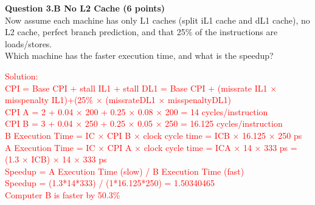 \documentclass[a4paper,10pt]{article}
\begin{document}
\begin{enumerate}
\textbf{Question 3.B  No L2 Cache (6 points)}\\
Now assume each machine has only L1 caches (split iL1 cache and dL1 cache), no L2 cache, perfect branch prediction, and that 25\% of the instructions are loads/stores. \\
Which machine has the faster execution time, and what is the speedup?\\

\noindent\fbox
{%
    \parbox{\linewidth}
    {%
    \textcolor{red}{
        Solution: \\
      CPI = Base CPI + stall IL1 + stall DL1 = Base CPI + (missrate IL1 × misspenalty IL1)+(25\% × (missrateDL1
× misspenaltyDL1)\\
CPI A = 2 + 0.04 × 200 + 0.25 × 0.08 × 200 = 14 cycles/instruction\\
CPI B = 3 + 0.04 × 250 + 0.25 × 0.05 × 250 = 16.125 cycles/instruction\\
B Execution Time = IC × CPI B × clock cycle time = ICB × 16.125 × 250 ps\\
A Execution Time = IC × CPI A × clock cycle time = ICA × 14 × 333 ps = (1.3 × ICB) × 14 ×
333 ps\\
Speedup = A Execution Time (slow) / B Execution Time (fast)\\
Speedup = (1.3*14*333) / (1*16.125*250) = 1.50340465\\
Computer B is faster by 50.3\%
}
    }%
}

\end{enumerate}
\end{document}
